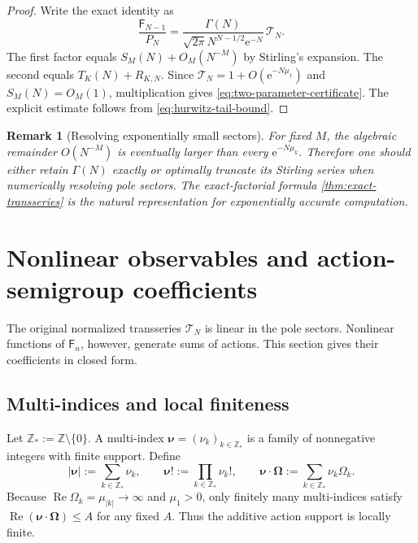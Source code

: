 \documentclass[11pt,oneside]{article}
\numberwithin{equation}{section}
\newtheorem{remark}[theorem]{Remark}
\newcommand{\e}{\mathrm e}
\newcommand{\Z}{\mathbb Z}
\newcommand{\Fub}{\mathsf F}
\newcommand{\abs}[1]{\left|#1\right|}
\newcommand{\RePart}{\operatorname{Re}}
\begin{document}
\begin{proof}
Write the exact identity as
\[
 \frac{\Fub_{N-1}}{P_N}
 =\frac{\Gamma(N)}{\sqrt{2\pi}N^{N-1/2}\e^{-N}}\,\mathscr T_N.
\]
The first factor equals \(S_M(N)+O_M(N^{-M})\) by Stirling's expansion.  The second equals \(T_K(N)+R_{K,N}\).  Since \(\mathscr T_N=1+O(\e^{-N\mu_1})\) and \(S_M(N)=O_M(1)\), multiplication gives \cref{eq:two-parameter-certificate}.  The explicit estimate follows from \cref{eq:hurwitz-tail-bound}.
\end{proof}

\begin{remark}[Resolving exponentially small sectors]
For fixed \(M\), the algebraic remainder \(O(N^{-M})\) is eventually larger than every \(\e^{-N\mu_k}\).  Therefore one should either retain \(\Gamma(N)\) exactly or optimally truncate its Stirling series when numerically resolving pole sectors.  The exact-factorial formula \cref{thm:exact-transseries} is the natural representation for exponentially accurate computation.
\end{remark}

\section{Nonlinear observables and action-semigroup coefficients}
\label{sec:nonlinear}

The original normalized transseries \(\mathscr T_N\) is linear in the pole sectors.  Nonlinear functions of \(\Fub_n\), however, generate sums of actions.  This section gives their coefficients in closed form.

\subsection{Multi-indices and local finiteness}

Let \(\Z_*:=\Z\setminus\{0\}\).  A multi-index
\(\bm\nu=(\nu_k)_{k\in\Z_*}\) is a family of nonnegative integers with finite support.  Define
\begin{equation}
 \abs{\bm\nu}:=\sum_{k\in\Z_*}\nu_k,
 \qquad
 \bm\nu!:=\prod_{k\in\Z_*}\nu_k!,
 \qquad
 \bm\nu\!\cdot\!\bm\Omega:=\sum_{k\in\Z_*}\nu_k\Omega_k.
 \label{eq:multiindex-definitions}
\end{equation}
Because \(\RePart\Omega_k=\mu_{|k|}\to\infty\) and \(\mu_1>0\), only finitely many multi-indices satisfy
\(\RePart(\bm\nu\cdot\bm\Omega)\le A\) for any fixed \(A\).  Thus the additive action support is locally finite.
\end{document}
